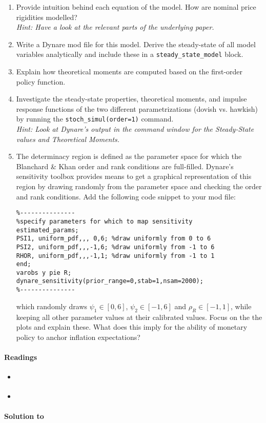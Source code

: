 \begin{enumerate}

\item Provide intuition behind each equation of the model.
How are nominal price rigidities modelled?\\\emph{Hint: Have a look at the relevant parts of the underlying paper.}

\item Write a Dynare mod file for this model. Derive the steady-state of all model variables analytically and include these in a \texttt{steady\_state\_model} block.

\item Explain how theoretical moments are computed based on the first-order policy function.

\item Investigate the steady-state properties, theoretical moments, and impulse response functions of the two different parametrizations (dovish vs. hawkish) 
  by running the \texttt{stoch\_simul(order=1)} command.
\\
\emph{Hint: Look at Dynare's output in the command window for the Steady-State values and Theoretical Moments.}

\item The determinacy region is defined as the parameter space for which the Blanchard \& Khan order and rank conditions are full-filled.
Dynare's sensitivity toolbox provides means to get a graphical representation of this region
  by drawing randomly from the parameter space and checking the order and rank conditions.
Add the following code snippet to your mod file:
\begin{verbatim}
%---------------
%specify parameters for which to map sensitivity
estimated_params;
PSI1, uniform_pdf,,, 0,6; %draw uniformly from 0 to 6
PSI2, uniform_pdf,,,-1,6; %draw uniformly from -1 to 6
RHOR, uniform_pdf,,,-1,1; %draw uniformly from -1 to 1
end;
varobs y pie R;
dynare_sensitivity(prior_range=0,stab=1,nsam=2000);		
%---------------
\end{verbatim}	
  which randomly draws $\psi_1 \in [0,6]$, $\psi_2 \in [-1,6]$ and $\rho_R \in [-1,1]$,
  while keeping all other parameter values at their calibrated values.
Focus on the the plots and explain these.
What does this imply for the ability of monetary policy to anchor inflation expectations?
\end{enumerate}

\paragraph{Readings}
\begin{itemize}
	\item \textcite{An.Schorfheide_2007_BayesianAnalysisDSGE}
	\item \textcite{Ivashchenko.Mutschler_2020_EffectObservablesFunctionala}
\end{itemize}

\begin{solution}\textbf{Solution to }
\ifDisplaySolutions

\fi
\newpage
\end{solution}